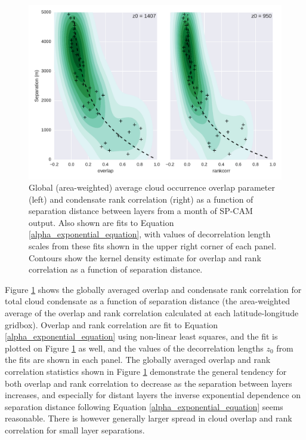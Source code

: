 \begin{figure}
\includegraphics[width=\columnwidth]{graphics/subgrid2_overlap_dz.pdf}
\caption{Global (area-weighted) average cloud occurrence overlap parameter (left) and condensate rank correlation (right) as a function of separation distance between layers from a month of SP-CAM output. Also shown are fits to Equation \ref{alpha_exponential_equation}, with values of decorrelation length scales from these fits shown in the upper right corner of each panel. Contours show the kernel density estimate for overlap and rank correlation as a function of separation distance.}
\label{subgrid2_overlap_dz}
\end{figure}

Figure \ref{subgrid2_overlap_dz} shows the globally averaged overlap and condensate rank correlation for total cloud condensate as a function of separation distance (the area-weighted average of the overlap and rank correlation calculated at each latitude-longitude gridbox). Overlap and rank correlation are fit to Equation \ref{alpha_exponential_equation} using non-linear least squares, and the fit is plotted on Figure \ref{subgrid2_overlap_dz} as well, and the values of the decorrelation lengths $z_0$ from the fits are shown in each panel. The globally averaged overlap and rank correlation statistics shown in Figure \ref{subgrid2_overlap_dz} demonstrate the general tendency for both overlap and rank correlation to decrease as the separation between layers increases, and especially for distant layers the inverse exponential dependence on separation distance following Equation \ref{alpha_exponential_equation} seems reasonable. There is however generally larger spread in cloud overlap and rank correlation for small layer separations. 

